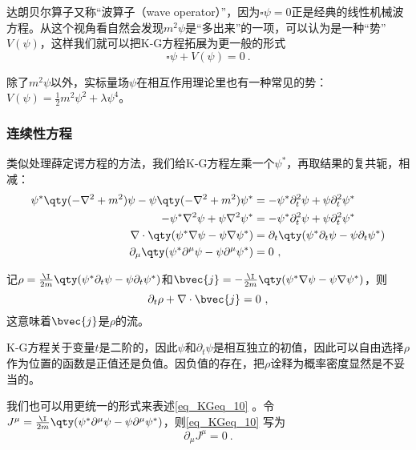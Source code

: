 达朗贝尔算子又称“波算子（wave operator）”，因为$\square \psi=0$正是经典的线性机械波方程。从这个视角看自然会发现$m^2\psi$是“多出来”的一项，可以认为是一种“势”$V(\psi)$，这样我们就可以把K-G方程拓展为更一般的形式
\begin{equation}
\square\psi + V(\psi) = 0~.
\end{equation}

除了$m^2\psi$以外，实标量场$\psi$在相互作用理论里也有一种常见的势：$V(\psi)=\frac{1}{2}m^2\psi^2+\lambda\psi^4$。





\subsubsection{连续性方程}

类似处理薛定谔方程的方法，我们给K-G方程左乘一个$\psi^*$，再取结果的复共轭，相减：
\begin{equation} %
\begin{aligned}
\psi^*\qty(-\nabla^2+m^2)\psi-\psi\qty(-\nabla^2+m^2)\psi^* &= -\psi^*\partial_t^2 \psi+\psi\partial_t^2 \psi^*\\
-\psi^*\nabla^2\psi+\psi\nabla^2\psi^* &= -\psi^*\partial_t^2\psi+\psi\partial_t^2\psi^*\\
\nabla\cdot\qty(\psi^*\nabla\psi-\psi\nabla\psi^*) &= \partial_t\qty(\psi^*\partial_t\psi-\psi\partial_t\psi^*)\\
\partial_\mu\qty(\psi^*\partial^\mu\psi-\psi\partial^\mu\psi^*) & =0~,
\end{aligned}
\end{equation}


记$\rho=\frac{\I}{2m}\qty(\psi^*\partial_t\psi-\psi\partial_t\psi^*)$和$\bvec{j}=-\frac{\I}{2m}\qty(\psi^*\nabla\psi-\psi\nabla\psi^*)$，则%
\begin{equation}\label{eq_KGeq_10}
\partial_t\rho+\nabla\cdot\bvec{j} = 0~,
\end{equation}
这意味着$\bvec{j}$是$\rho$的流。

K-G方程关于变量$t$是二阶的，因此$\psi$和$\partial_t\psi$是相互独立的初值，因此可以自由选择$\rho$作为位置的函数是正值还是负值。因负值的存在，把$\rho$诠释为概率密度显然是不妥当的。

我们也可以用更统一的形式来表述\autoref{eq_KGeq_10} 。令$J^\mu=\frac{\I}{2m}\qty(\psi^*\partial^\mu\psi-\psi\partial^\mu\psi^*)$，则\autoref{eq_KGeq_10} 写为
\begin{equation}
\partial_\mu J^\mu = 0~.
\end{equation}



